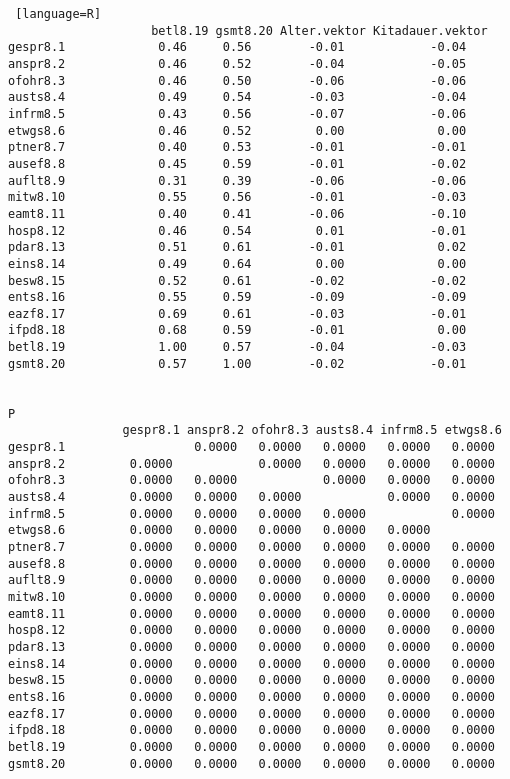 \begin{lstlisting} [language=R]
                    betl8.19 gsmt8.20 Alter.vektor Kitadauer.vektor
gespr8.1             0.46     0.56        -0.01            -0.04
anspr8.2             0.46     0.52        -0.04            -0.05
ofohr8.3             0.46     0.50        -0.06            -0.06
austs8.4             0.49     0.54        -0.03            -0.04
infrm8.5             0.43     0.56        -0.07            -0.06
etwgs8.6             0.46     0.52         0.00             0.00
ptner8.7             0.40     0.53        -0.01            -0.01
ausef8.8             0.45     0.59        -0.01            -0.02
auflt8.9             0.31     0.39        -0.06            -0.06
mitw8.10             0.55     0.56        -0.01            -0.03
eamt8.11             0.40     0.41        -0.06            -0.10
hosp8.12             0.46     0.54         0.01            -0.01
pdar8.13             0.51     0.61        -0.01             0.02
eins8.14             0.49     0.64         0.00             0.00
besw8.15             0.52     0.61        -0.02            -0.02
ents8.16             0.55     0.59        -0.09            -0.09
eazf8.17             0.69     0.61        -0.03            -0.01
ifpd8.18             0.68     0.59        -0.01             0.00
betl8.19             1.00     0.57        -0.04            -0.03
gsmt8.20             0.57     1.00        -0.02            -0.01


P
                gespr8.1 anspr8.2 ofohr8.3 austs8.4 infrm8.5 etwgs8.6
gespr8.1                  0.0000   0.0000   0.0000   0.0000   0.0000  
anspr8.2         0.0000            0.0000   0.0000   0.0000   0.0000  
ofohr8.3         0.0000   0.0000            0.0000   0.0000   0.0000  
austs8.4         0.0000   0.0000   0.0000            0.0000   0.0000  
infrm8.5         0.0000   0.0000   0.0000   0.0000            0.0000  
etwgs8.6         0.0000   0.0000   0.0000   0.0000   0.0000           
ptner8.7         0.0000   0.0000   0.0000   0.0000   0.0000   0.0000  
ausef8.8         0.0000   0.0000   0.0000   0.0000   0.0000   0.0000  
auflt8.9         0.0000   0.0000   0.0000   0.0000   0.0000   0.0000  
mitw8.10         0.0000   0.0000   0.0000   0.0000   0.0000   0.0000  
eamt8.11         0.0000   0.0000   0.0000   0.0000   0.0000   0.0000  
hosp8.12         0.0000   0.0000   0.0000   0.0000   0.0000   0.0000  
pdar8.13         0.0000   0.0000   0.0000   0.0000   0.0000   0.0000  
eins8.14         0.0000   0.0000   0.0000   0.0000   0.0000   0.0000  
besw8.15         0.0000   0.0000   0.0000   0.0000   0.0000   0.0000  
ents8.16         0.0000   0.0000   0.0000   0.0000   0.0000   0.0000  
eazf8.17         0.0000   0.0000   0.0000   0.0000   0.0000   0.0000  
ifpd8.18         0.0000   0.0000   0.0000   0.0000   0.0000   0.0000  
betl8.19         0.0000   0.0000   0.0000   0.0000   0.0000   0.0000  
gsmt8.20         0.0000   0.0000   0.0000   0.0000   0.0000   0.0000  
  

\end{lstlisting}
